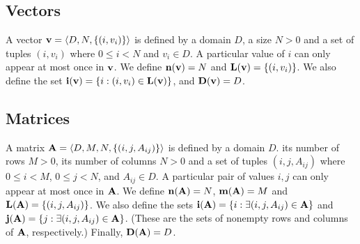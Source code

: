 \subsection{Vectors}
\label{Sec:Vectors}

 

A vector ${\bf v} = \langle D, N, \{ (i,v_i) \} \rangle$ is defined
by a domain $D$, a size $N>0$ and a set of tuples $(i,v_i)$ where
$0 \leq i < N$ and $v_i \in D$. A particular value of $i$ can only
appear at most once in ${\bf v}$. We define $\bold{n}({\bf v}) =
N$ and $\bold{L}({\bf v}) = \{ (i,v_i) \}$. We also define the set
${\bf i({\bf v})} = \{ i : (i,v_i) \in \bold{L}({\bf v}) \}$,
and $\bold{D}({\bf v}) = D$.



\subsection{Matrices}
\label{Sec:Matrices}


A matrix ${\bf A} = \langle D, M, N,  \{ (i,j,A_{ij}) \} \rangle$ is
defined by a domain $D$. its number of rows $M>0$, its number of columns
$N>0$ and a set of tuples $(i,j,A_{ij})$ where $0 \leq i < M$, $0 \leq
j < N$, and $A_{ij} \in D$. A particular pair of values $i,j$ can only
appear at most once in ${\bf A}$. We define $\bold{n}({\bf A})
= N$,  $\bold{m}({\bf A}) = M$ and $\bold{L}({\bf A}) = \{
(i,j,A_{ij}) \}$.  We also define the sets ${\bf i({\bf A})} = \{
i : \exists (i,j,A_{ij}) \in {\bf A} \}$ and ${\bf j({\bf A})}
= \{ j : \exists (i,j,A_{ij}) \in {\bf A} \}$.  (These are the sets
of nonempty rows and columns of ${\bf A}$, respectively.)  Finally,
$\bold{D}({\bf A}) = D$.

